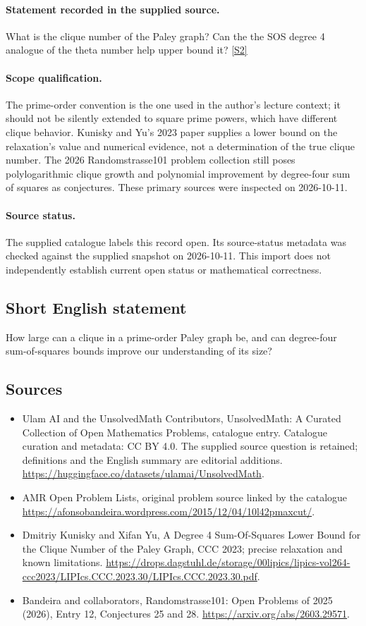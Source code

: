 \documentclass[11pt]{article}
\begin{document}
\paragraph{Statement recorded in the supplied source.}
What is the clique number of the Paley graph? Can the the SOS degree 4 analogue of the theta number help upper bound it? \href{https://afonsobandeira.wordpress.com/2015/12/04/10l42pmaxcut/}{[S2]}
\paragraph{Scope qualification.}
The prime-order convention is the one used in the author's lecture context; it should not be silently extended to square prime powers, which have different clique behavior. Kunisky and Yu's 2023 paper supplies a lower bound on the relaxation's value and numerical evidence, not a determination of the true clique number. The 2026 Randomstrasse101 problem collection still poses polylogarithmic clique growth and polynomial improvement by degree-four sum of squares as conjectures. These primary sources were inspected on 2026-10-11.
\paragraph{Source status.}
The supplied catalogue labels this record open. Its source-status metadata was checked against the supplied snapshot on 2026-10-11. This import does not independently establish current open status or mathematical correctness.
\subsection{Short English statement}
How large can a clique in a prime-order Paley graph be, and can degree-four sum-of-squares bounds improve our understanding of its size?
\subsection{Sources}
\begin{itemize}
\item[S1] Ulam AI and the UnsolvedMath Contributors, UnsolvedMath: A Curated Collection of Open Mathematics Problems, catalogue entry. Catalogue curation and metadata: CC BY 4.0. The supplied source question is retained; definitions and the English summary are editorial additions.
\url{https://huggingface.co/datasets/ulamai/UnsolvedMath}.
\item[S2] AMR Open Problem Lists, original problem source linked by the catalogue
\url{https://afonsobandeira.wordpress.com/2015/12/04/10l42pmaxcut/}.
\item[S3] Dmitriy Kunisky and Xifan Yu, A Degree 4 Sum-Of-Squares Lower Bound for the Clique Number of the Paley Graph, CCC 2023; precise relaxation and known limitations.
\url{https://drops.dagstuhl.de/storage/00lipics/lipics-vol264-ccc2023/LIPIcs.CCC.2023.30/LIPIcs.CCC.2023.30.pdf}.
\item[S4] Bandeira and collaborators, Randomstrasse101: Open Problems of 2025 (2026), Entry 12, Conjectures 25 and 28.
\url{https://arxiv.org/abs/2603.29571}.
\end{itemize}
\end{document}
